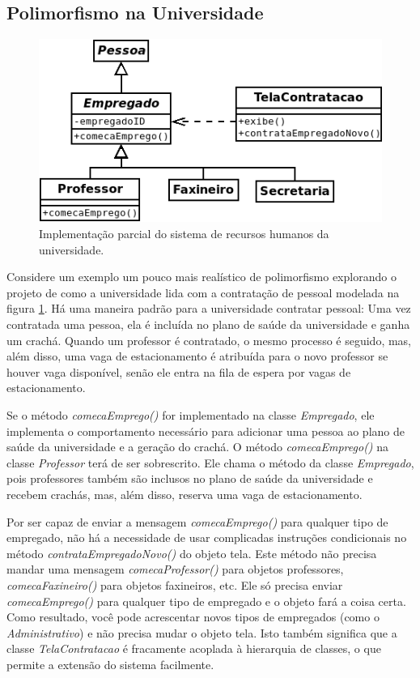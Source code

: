 \subsection{Polimorfismo na Universidade}
\begin{figure}
\begin{center}
\includegraphics[scale=0.65]{uniRH.png}
\end{center}
\caption{Implementação parcial do sistema de recursos humanos da universidade.} \label{fig:uniRH}
\end{figure}

Considere um exemplo um pouco mais realístico de polimorfismo explorando o projeto de como a universidade lida com a contratação de pessoal modelada na figura \ref{fig:uniRH}. Há uma maneira padrão para a universidade contratar pessoal: Uma vez contratada uma pessoa, ela é incluída no plano de saúde da universidade e ganha um crachá. Quando um professor é contratado, o mesmo processo é seguido, mas, além disso, uma vaga de estacionamento é atribuída para o novo professor se houver vaga disponível, senão ele entra na fila de espera por vagas de estacionamento.

Se o método \emph{comecaEmprego()} for implementado na classe \emph{Empregado}, ele implementa o comportamento necessário para adicionar uma pessoa ao plano de saúde da universidade e a geração do crachá. O método \emph{comecaEmprego()} na classe \emph{Professor} terá de ser sobrescrito. Ele chama o método da classe \emph{Empregado}, pois professores também são inclusos no plano de saúde da universidade e recebem crachás, mas, além disso, reserva uma vaga de estacionamento.

Por ser capaz de enviar a mensagem \emph{comecaEmprego()} para qualquer tipo de empregado, não há a necessidade de usar complicadas instruções condicionais no método \emph{contrataEmpregadoNovo()} do objeto tela. Este método não precisa mandar uma mensagem \emph{comecaProfessor()} para objetos professores, \emph{comecaFaxineiro()} para objetos faxineiros, etc. Ele só precisa enviar \emph{comecaEmprego()} para qualquer tipo de empregado e o objeto fará a coisa certa. Como resultado, você pode acrescentar novos tipos de empregados (como o \emph{Administrativo}) e não precisa mudar o objeto tela. Isto também significa que a classe \emph{TelaContratacao} é fracamente acoplada à hierarquia de classes, o que permite a extensão do sistema facilmente.

